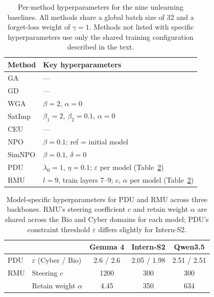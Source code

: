 \begin{table}[t]
\centering
\caption{Per-method hyperparameters for the nine unlearning baselines. All methods share a global batch size of 32 and a forget-loss weight of $\gamma = 1$. Methods not listed with specific hyperparameters use only the shared training configuration described in the text.}
\label{tab:baseline-hparams}
\begin{tabular}{ll}
\toprule
Method & Key hyperparameters \\
\midrule
GA & --- \\
GD & --- \\
WGA & $\beta\!=\!2$, $\alpha\!=\!0$ \\
SatImp & $\beta_1\!=\!2$, $\beta_2\!=\!0.1$, $\alpha\!=\!0$ \\
CEU & --- \\
NPO & $\beta\!=\!0.1$; ref = initial model \\
SimNPO & $\beta\!=\!0.1$, $\delta\!=\!0$ \\
PDU & $\lambda_0\!=\!1$, $\eta\!=\!0.1$; $\varepsilon$ per model (Table~\ref{tab:baseline-model-hparams}) \\
RMU & $l\!=\!9$, train layers 7--9; $c$, $\alpha$ per model (Table~\ref{tab:baseline-model-hparams}) \\
\bottomrule
\end{tabular}
\end{table}

\begin{table}[t]
\centering
\caption{Model-specific hyperparameters for PDU and RMU across three backbones. RMU's steering coefficient $c$ and retain weight $\alpha$ are shared across the Bio and Cyber domains for each model; PDU's constraint threshold $\varepsilon$ differs slightly for Intern-S2.}
\label{tab:baseline-model-hparams}
\begin{tabular}{llccc}
\toprule
 & & Gemma 4 & Intern-S2 & Qwen3.5 \\
\midrule
PDU & $\varepsilon$ (Cyber / Bio) & 2.6 / 2.6 & 2.05 / 1.98 & 2.51 / 2.51 \\
\midrule
RMU & Steering $c$ & 1200 & 300 & 300 \\
 & Retain weight $\alpha$ & 4.45 & 350 & 634 \\
\bottomrule
\end{tabular}
\end{table}


